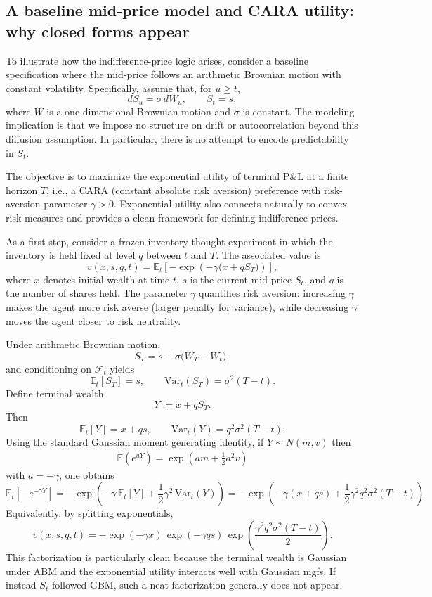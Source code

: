 \subsection{A baseline mid-price model and CARA utility: why closed forms appear}
To illustrate how the indifference-price logic arises, consider a baseline specification where the mid-price follows an arithmetic Brownian motion with constant volatility. Specifically, assume that, for $u\ge t$,
\[
dS_u = \sigma\, dW_u,
\qquad S_t=s,
\]
where $W$ is a one-dimensional Brownian motion and $\sigma$ is constant. The modeling implication is that we impose no structure on drift or autocorrelation beyond this diffusion assumption. In particular, there is no attempt to encode predictability in $S_t$.

The objective is to maximize the exponential utility of terminal P\&L at a finite horizon $T$, i.e., a CARA (constant absolute risk aversion) preference with risk-aversion parameter $\gamma>0$. Exponential utility also connects naturally to convex risk measures and provides a clean framework for defining indifference prices.

As a first step, consider a frozen-inventory thought experiment in which the inventory is held fixed at level $q$ between $t$ and $T$. The associated value is
\[
v(x,s,q,t)
=
\mathbb{E}_t\!\left[-\exp\!\left(-\gamma\bigl(x+qS_T\bigr)\right)\right],
\]
where $x$ denotes initial wealth at time $t$, $s$ is the current mid-price $S_t$, and $q$ is the number of shares held. The parameter $\gamma$ quantifies risk aversion: increasing $\gamma$ makes the agent more risk averse (larger penalty for variance), while decreasing $\gamma$ moves the agent closer to risk neutrality.

Under arithmetic Brownian motion,
\[
S_T = s + \sigma\bigl(W_T-W_t\bigr),
\]
and conditioning on $\mathcal{F}_t$ yields
\[
\mathbb{E}_t[S_T]=s,
\qquad
\mathrm{Var}_t(S_T)=\sigma^2(T-t).
\]
Define terminal wealth
\[
Y:=x+qS_T.
\]
Then
\[
\mathbb{E}_t[Y]=x+qs,
\qquad
\mathrm{Var}_t(Y)=q^2\sigma^2(T-t).
\]
Using the standard Gaussian moment generating identity, if $Y\sim N(m,v)$ then 
\begin{align*}
    \mathbb{E}(e^{aY})=\exp(am+\tfrac12a^2v)
\end{align*}
with $a=-\gamma$, one obtains
\[
\mathbb{E}_t\!\left[-e^{-\gamma Y}\right]
=
-\exp\!\left(
-\gamma\,\mathbb{E}_t[Y]
+\frac12\gamma^2\,\mathrm{Var}_t(Y)
\right)
=
-\exp\!\left(
-\gamma(x+qs)
+\frac12\gamma^2 q^2\sigma^2(T-t)
\right).
\]
Equivalently, by splitting exponentials,
\[
v(x,s,q,t)
=
-\exp(-\gamma x)\,
\exp(-\gamma q s)\,
\exp\!\left(\frac{\gamma^2 q^2 \sigma^2 (T-t)}{2}\right).
\]
This factorization is particularly clean because the terminal wealth is Gaussian under ABM and the exponential utility interacts well with Gaussian mgfs. If instead $S_t$ followed GBM, such a neat factorization generally does not appear.


